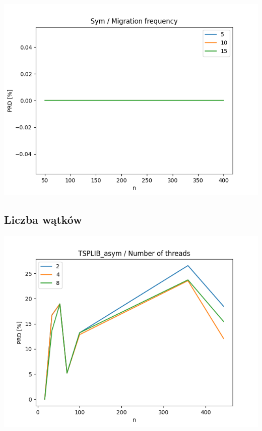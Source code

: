\documentclass{article}
\begin{document}
\begin{center}
\includegraphics[width=\textwidth, 
                   height = 0.4\textheight, 
                   keepaspectratio]
                  {plots/sym_11_migration_freq} 
\end{center}


\subsection{Liczba wątków}

\begin{center}
\includegraphics[width=\textwidth, 
                   height = 0.4\textheight, 
                   keepaspectratio]
                  {plots/tsplib_asym_12_num_of_threads} 
\end{center}
\end{document}
